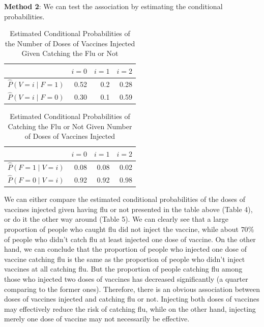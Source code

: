 \documentclass[
]{book}
\begin{document}
\textbf{Method 2}: We can test the association by estimating the conditional probabilities.

\begin{table}

\caption{\label{tab:unnamed-chunk-12}Estimated Conditional Probabilities of the Number of Doses of Vaccines Injected Given Catching the Flu or Not}
\centering
\begin{tabular}[t]{l|r|r|r}
\hline
  & $i = 0$ & $i = 1$ & $i = 2$\\
\hline
$\hat{P}(V = i \mid F = 1)$ & 0.52 & 0.2 & 0.28\\
\hline
$\hat{P}(V = i \mid F = 0)$ & 0.30 & 0.1 & 0.59\\
\hline
\end{tabular}
\end{table}

\begin{table}

\caption{\label{tab:unnamed-chunk-12}Estimated Conditional Probabilities of Catching the Flu or Not Given Number of Doses of Vaccines Injected}
\centering
\begin{tabular}[t]{l|r|r|r}
\hline
  & $i = 0$ & $i = 1$ & $i = 2$\\
\hline
$\hat{P}(F = 1 \mid V = i)$ & 0.08 & 0.08 & 0.02\\
\hline
$\hat{P}(F = 0 \mid V = i)$ & 0.92 & 0.92 & 0.98\\
\hline
\end{tabular}
\end{table}

We can either compare the estimated conditional probabilities of the doses of vaccines injected given having flu or not presented in the table above (Table 4), or do it the other way around (Table 5). We can clearly see that a large proportion of people who caught flu did not inject the vaccine, while about \(70\%\) of people who didn't catch flu at least injected one dose of vaccine. On the other hand, we can conclude that the proportion of people who injected one dose of vaccine catching flu is the same as the proportion of people who didn't inject vaccines at all catching flu. But the proportion of people catching flu among those who injected two doses of vaccines has decreased significantly (a quarter comparing to the former ones). Therefore, there is an obvious association between doses of vaccines injected and catching flu or not. Injecting both doses of vaccines may effectively reduce the risk of catching flu, while on the other hand, injecting merely one dose of vaccine may not necessarily be effective.
\end{document}
